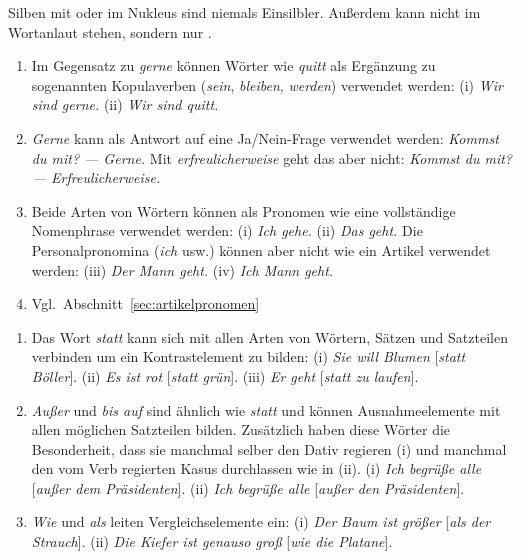 
Silben mit \textipa{[@]} oder \textipa{[5]} im Nukleus sind niemals Einsilbler.
Außerdem kann \textipa{[s]} nicht im Wortanlaut stehen, sondern nur \textipa{[z]}.



\begin{sloppypar}

\begin{enumerate}\Lf
  \item Im Gegensatz zu \textit{gerne} können Wörter wie \textit{quitt} als Ergänzung zu sogenannten Kopulaverben (\textit{sein}, \textit{bleiben}, \textit{werden}) verwendet werden:
    (i) \Ast \textit{Wir sind gerne.} (ii) \textit{Wir sind quitt.}
  \item \textit{Gerne} kann als Antwort auf eine Ja\slash Nein-Frage verwendet werden:
    \textit{Kommst du mit? --- Gerne.}
    Mit \textit{erfreulicherweise} geht das aber nicht:
    \textit{Kommst du mit? --- \Ast Erfreulicherweise.}
  \item Beide Arten von Wörtern können als Pronomen wie eine vollständige Nomenphrase verwendet werden:
    (i) \textit{Ich gehe.}
    (ii) \textit{Das geht.}
    Die Personalpronomina (\textit{ich} usw.) können aber nicht wie ein Artikel verwendet werden:
    (iii) \textit{Der Mann geht.}
    (iv) \Ast \textit{Ich Mann geht.}
  \item Vgl.\ Abschnitt~\ref{sec:artikelpronomen}
\end{enumerate}

\end{sloppypar}


\begin{enumerate}\Lf
  \item Das Wort \textit{statt} kann sich mit allen Arten von Wörtern, Sätzen und Satzteilen verbinden um ein Kontrastelement zu bilden:
    (i) \textit{Sie will Blumen} [\textit{statt Böller}].
    (ii) \textit{Es ist rot} [\textit{statt grün}].
    (iii) \textit{Er geht} [\textit{statt zu laufen}]. 
  \item \textit{Außer} und \textit{bis auf} sind ähnlich wie \textit{statt} und können Ausnahmeelemente mit allen möglichen Satzteilen bilden.
    Zusätzlich haben diese Wörter die Besonderheit, dass sie manchmal selber den Dativ regieren (i) und manchmal den vom Verb regierten Kasus durchlassen wie in (ii).
    (i) \textit{Ich begrüße alle} [\textit{außer dem Präsidenten}].
    (ii) \textit{Ich begrüße alle} [\textit{außer den Präsidenten}].
  \item \textit{Wie} und \textit{als} leiten Vergleichselemente ein:
    (i) \textit{Der Baum ist größer} [\textit{als der Strauch}].
    (ii) \textit{Die Kiefer ist genauso groß} [\textit{wie die Platane}].
\end{enumerate}

